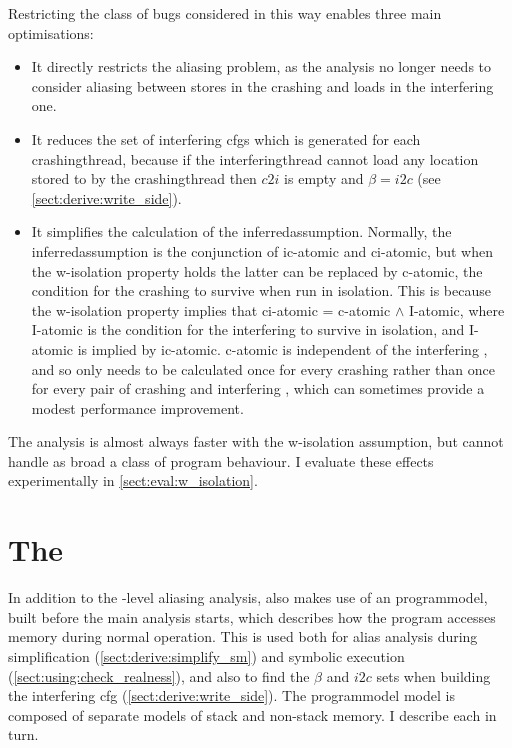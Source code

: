 Restricting the class of bugs considered in this way enables three
main optimisations:
\begin{itemize}
\item
  It directly restricts the aliasing problem, as the analysis no
  longer needs to consider aliasing between stores in the crashing
  {\StateMachine} and loads in the interfering one.
\item
  It reduces the set of interfering \glspl{cfg} which is generated for
  each \gls{crashingthread}, because if the \gls{interferingthread}
  cannot load any location stored to by the \gls{crashingthread} then
  $c2i$ is empty and $\beta = i2c$ (see
  \autoref{sect:derive:write_side}).
\item
  It simplifies the calculation of the \gls{inferredassumption}.
  Normally, the \gls{inferredassumption} is the conjunction of
  \gls{ic-atomic} and \gls{ci-atomic}, but when the \gls{w-isolation}
  property holds the latter can be replaced by \gls{c-atomic}, the
  condition for the crashing {\StateMachine} to survive when run in
  isolation.  This is because the \gls{w-isolation} property implies
  that \gls{ci-atomic} = \gls{c-atomic} $\wedge$ I-atomic, where
  I-atomic is the condition for the interfering {\StateMachine} to
  survive in isolation, and I-atomic is implied by \gls{ic-atomic}.
  \gls{c-atomic} is independent of the interfering {\StateMachine},
  and so only needs to be calculated once for every crashing
  {\StateMachine} rather than once for every pair of crashing and
  interfering {\StateMachines}, which can sometimes provide a modest
  performance improvement.
\end{itemize}
The analysis is almost always faster with the \gls{w-isolation}
assumption, but cannot handle as broad a class of program behaviour.
I evaluate these effects experimentally in
\autoref{sect:eval:w_isolation}.

\section{The }
\label{sect:program_model}

In addition to the {\StateMachine}-level aliasing analysis,
{\technique} also makes use of an \gls{programmodel}, built before the
main analysis starts, which describes how the program accesses memory
during normal operation.  This is used both for alias analysis during
{\StateMachine} simplification (\autoref{sect:derive:simplify_sm}) and
symbolic execution (\autoref{sect:using:check_realness}), and also to
find the $\beta$ and $i2c$ sets when building the interfering
\gls{cfg} (\autoref{sect:derive:write_side}).  The \gls{programmodel}
model is composed of separate models of stack and non-stack memory.  I
describe each in turn.

